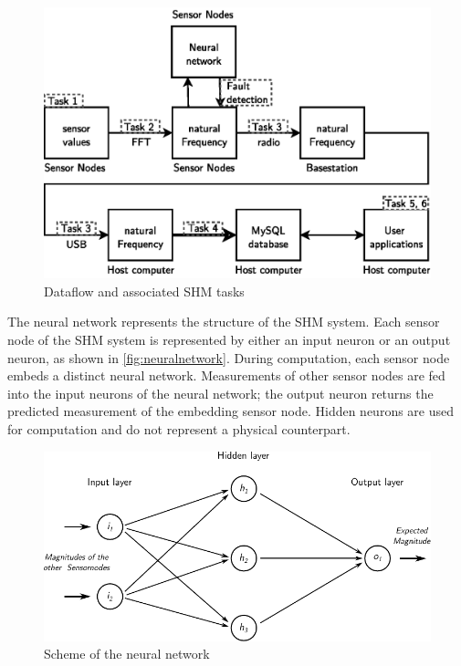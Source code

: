 \documentclass[12pt,a4paper]{scrartcl}
\begin{document}
\begin{figure}[hbtp]
    \centering
    \includegraphics{figures/dataflow_tasks_nn.eps}
    \caption{Dataflow and associated SHM tasks}
    \label{fig:flow}
\end{figure}


The neural network represents the structure of the SHM system.
Each sensor node of the SHM system is represented by either an input neuron or an output neuron, as shown in \autoref{fig:neuralnetwork}.
During computation, each sensor node embeds a distinct neural network. 
Measurements of other sensor nodes are fed into the input neurons of the neural network; the output neuron returns the predicted measurement of the embedding sensor node. 
Hidden neurons are used for computation and do not represent a physical counterpart.

\begin{figure}[hbtp]
    \centering
    \includegraphics{figures/neuralnetwork.pdf}
    \caption{Scheme of the neural network}
    \label{fig:neuralnetwork}
\end{figure}
\end{document}
